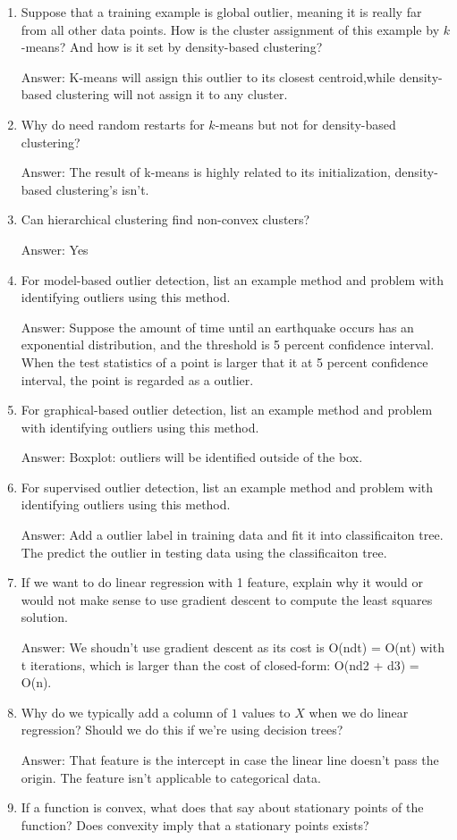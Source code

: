 \documentclass{article}
\def\ans#1{\par\gre{Answer: #1}}
\def\gre#1{{\color{gre}#1}}
\begin{document}
\begin{enumerate}
\item Suppose that a training example is global outlier, meaning it is really far from all other data points. How is the cluster assignment of this example by $k$-means? And how is it set by density-based clustering?
\ans{K-means will assign this outlier to its closest centroid,while density-based clustering will not assign it to any cluster.}
\item Why do need random restarts for $k$-means but not for density-based clustering?
\ans{The result of k-means is highly related to its initialization, density-based clustering's isn't.}
\item Can hierarchical clustering find non-convex clusters?
\ans{Yes}
\item For model-based outlier detection, list an example method and problem with identifying outliers using this method.
\ans{Suppose the amount of time until an earthquake occurs has an exponential distribution, and the threshold is 5 percent confidence interval. When the test statistics of a point is larger that it at 5 percent confidence interval, the point is regarded as a outlier.}
\item For graphical-based outlier detection, list an example method and problem with identifying outliers using this method.
\ans{Boxplot: outliers will be identified outside of the box.}
\item For supervised outlier detection, list an example method and problem with identifying outliers using this method.
\ans{Add a outlier label in training data and fit it into classificaiton tree. The predict the outlier in testing data using the classificaiton tree.}
\item If we want to do linear regression with 1 feature, explain why it would or would not make sense to use gradient descent to compute the least squares solution.
\ans{We shoudn't use gradient descent as its cost is O(ndt) = O(nt) with t iterations, which is larger than the cost of closed-form: O(nd2 + d3) = O(n).}
\item Why do we typically add a column of $1$ values to $X$ when we do linear regression? Should we do this if we're using decision trees?
\ans{That feature is the intercept in case the linear line doesn't pass the origin. The feature isn't applicable to categorical data.}
\item If a function is convex, what does that say about stationary points of the function? Does convexity imply that a stationary points exists?

\end{enumerate}
\end{document}
